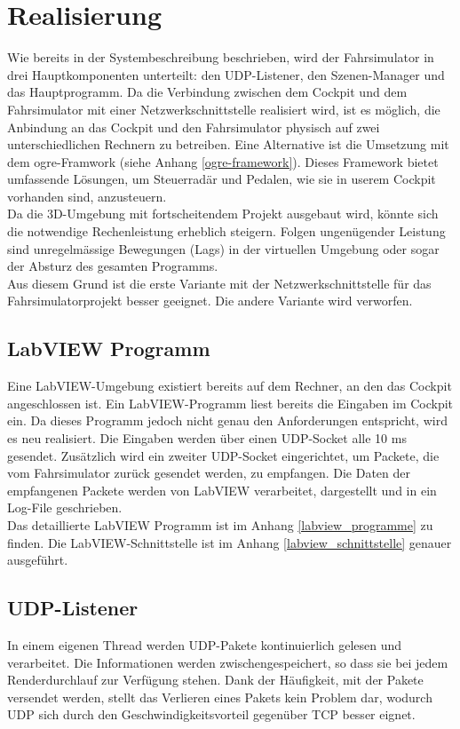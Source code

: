 \section{Realisierung}
Wie bereits in der Systembeschreibung beschrieben, wird der Fahrsimulator in drei Hauptkomponenten unterteilt: den UDP-Listener, den Szenen-Manager und das Hauptprogramm. Da die Verbindung zwischen dem Cockpit und dem Fahrsimulator mit einer Netzwerkschnittstelle realisiert wird, ist es möglich, die Anbindung an das Cockpit und den Fahrsimulator physisch auf zwei unterschiedlichen Rechnern zu betreiben. Eine Alternative ist die Umsetzung mit dem \gls{ogre}-Framwork (siehe Anhang \ref{ogre-framework}). Dieses Framework bietet umfassende Lösungen, um Steuerradär und Pedalen, wie sie in userem Cockpit vorhanden sind, anzusteuern.\\
Da die 3D-Umgebung mit fortscheitendem Projekt ausgebaut wird, könnte sich die notwendige Rechenleistung erheblich steigern. Folgen ungenügender Leistung sind unregelmässige Bewegungen (Lags) in der virtuellen Umgebung oder sogar der Absturz des gesamten Programms.\\
Aus diesem Grund ist die erste Variante mit der Netzwerkschnittstelle für das Fahrsimulatorprojekt besser geeignet. Die andere Variante wird verworfen.

\subsection{LabVIEW Programm}
Eine LabVIEW-Umgebung existiert bereits auf dem Rechner, an den das Cockpit angeschlossen ist. Ein LabVIEW-Programm liest bereits die Eingaben im Cockpit ein. Da dieses Programm jedoch nicht genau den Anforderungen entspricht, wird es neu realisiert. Die Eingaben werden über einen UDP-Socket alle 10 ms gesendet. Zusätzlich wird ein zweiter UDP-Socket eingerichtet, um Packete, die vom Fahrsimulator zurück gesendet werden, zu empfangen. Die Daten der empfangenen Packete werden von LabVIEW verarbeitet, dargestellt und in ein Log-File geschrieben.\\
Das detaillierte LabVIEW Programm ist im Anhang \ref{labview_programme} zu finden. Die LabVIEW-Schnittstelle ist im Anhang \ref{labview_schnittstelle} genauer ausgeführt.

\subsection{UDP-Listener}
\label{sec:udp-listener}
In einem eigenen Thread werden UDP-Pakete kontinuierlich gelesen und verarbeitet. Die Informationen werden zwischengespeichert, so dass sie bei jedem Renderdurchlauf zur Verfügung stehen. Dank der Häufigkeit, mit der Pakete versendet werden, stellt das Verlieren eines Pakets kein Problem dar, wodurch UDP sich durch den Geschwindigkeitsvorteil gegenüber TCP besser eignet.

